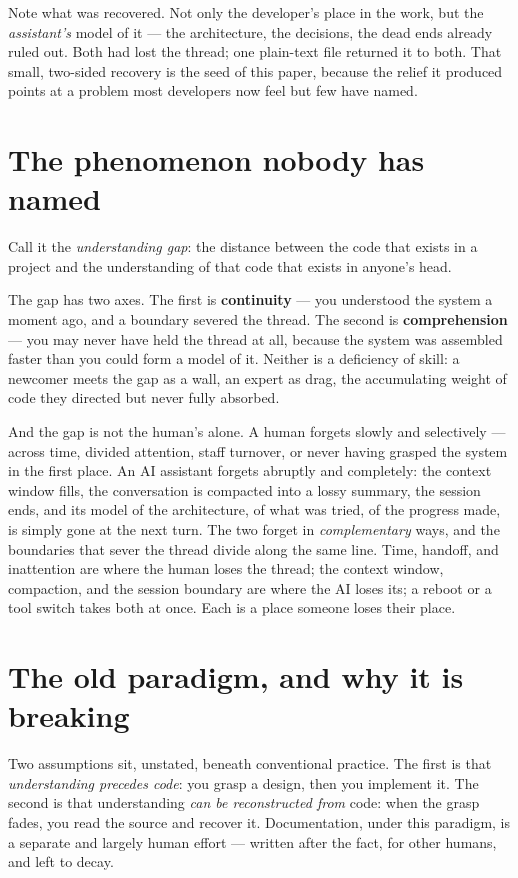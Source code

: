 \documentclass[11pt]{article}
\begin{document}
Note what was recovered. Not only the developer's place in the work, but the \emph{assistant's}
model of it --- the architecture, the decisions, the dead ends already ruled out. Both had lost
the thread; one plain-text file returned it to both. That small, two-sided recovery is the seed of
this paper, because the relief it produced points at a problem most developers now feel but few
have named.

\section{The phenomenon nobody has named}

Call it the \emph{understanding gap}: the distance between the code that exists in a project and
the understanding of that code that exists in anyone's head.

The gap has two axes. The first is \textbf{continuity} --- you understood the system a moment ago,
and a boundary severed the thread. The second is \textbf{comprehension} --- you may never have
held the thread at all, because the system was assembled faster than you could form a model of it.
Neither is a deficiency of skill: a newcomer meets the gap as a wall, an expert as drag, the
accumulating weight of code they directed but never fully absorbed.

And the gap is not the human's alone. A human forgets slowly and selectively --- across time,
divided attention, staff turnover, or never having grasped the system in the first place. An AI
assistant forgets abruptly and completely: the context window fills, the conversation is compacted
into a lossy summary, the session ends, and its model of the architecture, of what was tried, of
the progress made, is simply gone at the next turn. The two forget in \emph{complementary} ways,
and the boundaries that sever the thread divide along the same line. Time, handoff, and inattention
are where the human loses the thread; the context window, compaction, and the session boundary are
where the AI loses its; a reboot or a tool switch takes both at once. Each is a place someone loses
their place.

\section{The old paradigm, and why it is breaking}

Two assumptions sit, unstated, beneath conventional practice. The first is that \emph{understanding
precedes code}: you grasp a design, then you implement it. The second is that understanding
\emph{can be reconstructed from} code: when the grasp fades, you read the source and recover it.
Documentation, under this paradigm, is a separate and largely human effort --- written after the
fact, for other humans, and left to decay.
\end{document}
